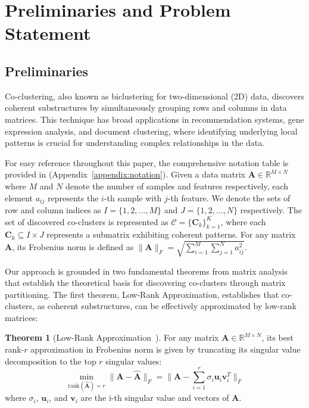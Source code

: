 \documentclass[journal]{IEEEtran}
\theoremstyle{definition}
\newtheorem{theorem}{Theorem}
\theoremstyle{remark} %
\renewcommand{\cite}[1]{~\autocite{#1}}
\begin{document}
\section{Preliminaries and Problem Statement}
\label{sec:problem-formulation}
\subsection{Preliminaries}
Co-clustering, also known as biclustering for two-dimensional (2D) data, discovers coherent substructures by simultaneously grouping rows and columns in data matrices. This technique has broad applications in recommendation systems, gene expression analysis, and document clustering, where identifying underlying local patterns is crucial for understanding complex relationships in the data.

    {\color{blue} For easy reference throughout this paper, the comprehensive notation table is provided in  (Appendix~\ref{appendix:notation}).} Given a data matrix $\mathbf{A} \in \mathbb{R}^{M \times N}$ where $M$ and $N$ denote the number of samples and features respectively, each element $a_{ij}$ represents the $i$-th sample with $j$-th feature. We denote the sets of row and column indices as $I = \{1,2,\ldots,M\}$ and $J = \{1,2,\ldots,N\}$ respectively. The set of discovered co-clusters is represented as $\mathcal{C} = \{\mathbf{C}_k\}_{k=1}^K$, where each $\mathbf{C}_k \subseteq I \times J$ represents a submatrix exhibiting coherent patterns. For any matrix $\mathbf{A}$, its Frobenius norm is defined as $\|\mathbf{A}\|_F = \sqrt{\sum_{i=1}^M \sum_{j=1}^N a_{ij}^2}$.


Our approach is grounded in two fundamental theorems from matrix analysis that establish the theoretical basis for discovering co-clusters through matrix partitioning. The first theorem, Low-Rank Approximation, establishes that co-clusters, as coherent substructures, can be effectively approximated by low-rank matrices:

\begin{theorem}[Low-Rank Approximation\cite{eckart1936ApproximationOneMatrix}] \label{thm:low-rank-approximation}
    For any matrix $\mathbf{A} \in \mathbb{R}^{M \times N}$, its best rank-$r$ approximation in Frobenius norm is given by truncating its singular value decomposition to the top $r$ singular values:
    \begin{equation}
        \min_{\text{rank}(\hat{\mathbf{A}})=r} \|\mathbf{A} - \hat{\mathbf{A}}\|_F = \|\mathbf{A} - \sum_{i=1}^r \sigma_i \mathbf{u}_i\mathbf{v}_i^T\|_F
    \end{equation}
    where $\sigma_i$, $\mathbf{u}_i$, and $\mathbf{v}_i$ are the i-th singular value and vectors of $\mathbf{A}$.
\end{theorem}
\end{document}
